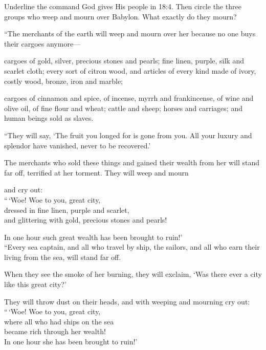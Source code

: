 \begin{ScriptureBox2}{Underline the command God gives His people in 18:4. Then circle the three groups who weep and mourn over Babylon. What exactly do they mourn?}
\item[18:11] ``The merchants of the earth will weep and mourn over her because no one buys their cargoes anymore---

\item[18:12] cargoes of gold, silver, precious stones and pearls; fine linen, purple, silk and scarlet cloth; every sort of citron wood, and articles of every kind made of ivory, costly wood, bronze, iron and marble;

\item[18:13] cargoes of cinnamon and spice, of incense, myrrh and frankincense, of wine and olive oil, of fine flour and wheat; cattle and sheep; horses and carriages; and human beings sold as slaves.

\item[18:14] ``They will say, `The fruit you longed for is gone from you. All your luxury and splendor have vanished, never to be recovered.'

\item[18:15] The merchants who sold these things and gained their wealth from her will stand far off, terrified at her torment. They will weep and mourn

\item[18:16] and cry out:\\
\hspace*{1em}``\,`Woe! Woe to you, great city,\\
\hspace*{2em}dressed in fine linen, purple and scarlet,\\
\hspace*{2em}and glittering with gold, precious stones and pearls!

\item[18:17] \hspace*{1em}In one hour such great wealth has been brought to ruin!'\\
``Every sea captain, and all who travel by ship, the sailors, and all who earn their living from the sea, will stand far off.

\item[18:18] When they see the smoke of her burning, they will exclaim, `Was there ever a city like this great city?'

\item[18:19] They will throw dust on their heads, and with weeping and mourning cry out:\\
\hspace*{1em}``\,`Woe! Woe to you, great city,\\
\hspace*{2em}where all who had ships on the sea\\
\hspace*{2em}became rich through her wealth!\\
\hspace*{1em}In one hour she has been brought to ruin!'


\end{ScriptureBox2}
